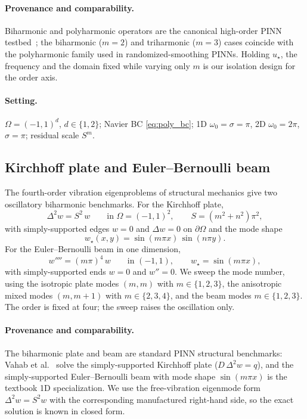 \paragraph{Provenance and comparability.}
Biharmonic and polyharmonic operators are the canonical high-order PINN
testbed~\cite{Vahab2022Biharmonic}; the biharmonic (\(m=2\)) and triharmonic
(\(m=3\)) cases coincide with the polyharmonic family used in
randomized-smoothing PINNs. Holding \(u_\star\), the frequency and the domain
fixed while varying only \(m\) is our isolation design for the order axis.

\paragraph{Setting.}
\(\Omega=(-1,1)^d\), \(d\in\{1,2\}\); Navier BC \eqref{eq:poly_bc};
1D \(\omega_0=\sigma=\pi\), 2D \(\omega_0=2\pi\), \(\sigma=\pi\);
residual scale \(S^m\).

\subsection{Kirchhoff plate and Euler--Bernoulli beam}\label{sec:bm:plate}

The fourth-order vibration eigenproblems of structural mechanics give two
oscillatory biharmonic benchmarks. For the Kirchhoff plate,
\begin{equation}\label{eq:plate_pde}
  \Delta^2 w = S^2\,w
  \qquad \text{in } \Omega = (-1,1)^2,
  \qquad S = (m^2 + n^2)\pi^2,
\end{equation}
with simply-supported edges \(w = 0\) and \(\Delta w = 0\) on \(\partial\Omega\)
and the mode shape
\begin{equation}\label{eq:plate_sol}
  w_\star(x,y) = \sin(m\pi x)\,\sin(n\pi y).
\end{equation}
For the Euler--Bernoulli beam in one dimension,
\begin{equation}\label{eq:beam_pde}
  w'''' = (m\pi)^4\,w
  \qquad \text{in } (-1,1),
  \qquad w_\star = \sin(m\pi x),
\end{equation}
with simply-supported ends \(w = 0\) and \(w'' = 0\). We sweep the mode number,
using the isotropic plate modes \((m,m)\) with \(m\in\{1,2,3\}\), the anisotropic
mixed modes \((m,m+1)\) with \(m\in\{2,3,4\}\), and the beam modes
\(m\in\{1,2,3\}\). The order is fixed at four; the sweep raises the oscillation
only.

\paragraph{Provenance and comparability.}
The biharmonic plate and beam are standard PINN structural benchmarks: Vahab et
al.~\cite{Vahab2022Biharmonic} solve the simply-supported Kirchhoff plate
(\(D\,\Delta^2 w = q\)), and the simply-supported Euler--Bernoulli beam with
mode shape \(\sin(m\pi x)\) is the textbook 1D specialization. We use the
free-vibration eigenmode form \(\Delta^2 w = S^2 w\) with the corresponding
manufactured right-hand side, so the exact solution is known in closed form.


